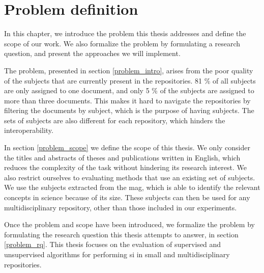 \section{Problem definition} \label{problem}

In this chapter, we introduce the problem this thesis addresses and define the scope of our work. We also formalize the problem by formulating a research question, and present the approaches we will implement.

The problem, presented in section \ref{problem_intro}, arises from the poor quality of the subjects that are currently present in the repositories. 81 \% of all subjects are only assigned to one document, and only 5 \% of the subjects are assigned to more than three documents. This makes it hard to navigate the repositories by filtering the documents by subject, which is the purpose of having subjects. The sets of subjects are also different for each repository, which hinders the interoperability.

In section \ref{problem_scope} we define the scope of this thesis. We only consider the titles and abstracts of theses and publications written in English, which reduces the complexity of the task without hindering its research interest. We also restrict ourselves to evaluating methods that use an existing set of subjects. We use the subjects extracted from  the \acrfull{mag}, which is able to identify the relevant concepts in science because of its size. These subjects can then be used for any multidisciplinary repository, other than those included in our experiments.

Once the problem and scope have been introduced, we formalize the problem by formulating the research question this thesis attempts to answer, in section \ref{problem_rq}. This thesis focuses on the evaluation of supervised and unsupervised algorithms for performing \acrlong{si} in small and multidisciplinary repositories. 





